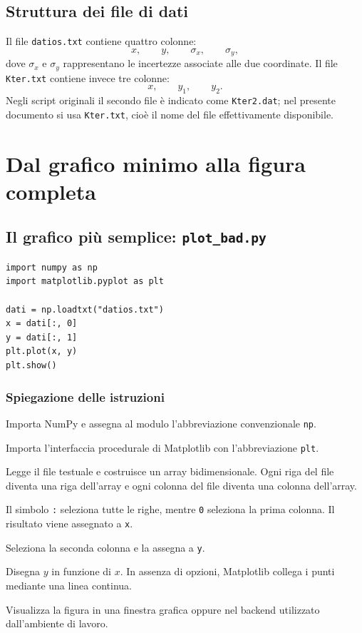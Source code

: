 \documentclass[11pt,a4paper]{book}
\begin{document}
\section{Struttura dei file di dati}
Il file \texttt{datios.txt} contiene quattro colonne:
\[
 x,\qquad y,\qquad \sigma_x,\qquad \sigma_y,
\]
dove $\sigma_x$ e $\sigma_y$ rappresentano le incertezze associate alle due coordinate. Il file \texttt{Kter.txt} contiene invece tre colonne:
\[
 x,\qquad y_1,\qquad y_2.
\]
Negli script originali il secondo file è indicato come \texttt{Kter2.dat}; nel presente documento si usa \texttt{Kter.txt}, cioè il nome del file effettivamente disponibile.

\chapter{Dal grafico minimo alla figura completa}

\section{Il grafico più semplice: \texttt{plot\_bad.py}}
\begin{lstlisting}
import numpy as np
import matplotlib.pyplot as plt

dati = np.loadtxt("datios.txt")
x = dati[:, 0]
y = dati[:, 1]
plt.plot(x, y)
plt.show()
\end{lstlisting}

\subsection*{Spiegazione delle istruzioni}
\begin{description}[style=nextline]
  \item[\texttt{import numpy as np}] Importa NumPy e assegna al modulo l'abbreviazione convenzionale \texttt{np}.
  \item[\texttt{import matplotlib.pyplot as plt}] Importa l'interfaccia procedurale di Matplotlib con l'abbreviazione \texttt{plt}.
  \item[\texttt{np.loadtxt("datios.txt")}] Legge il file testuale e costruisce un array bidimensionale. Ogni riga del file diventa una riga dell'array e ogni colonna del file diventa una colonna dell'array.
  \item[\texttt{dati[:, 0]}] Il simbolo \texttt{:} seleziona tutte le righe, mentre \texttt{0} seleziona la prima colonna. Il risultato viene assegnato a \texttt{x}.
  \item[\texttt{dati[:, 1]}] Seleziona la seconda colonna e la assegna a \texttt{y}.
  \item[\texttt{plt.plot(x, y)}] Disegna $y$ in funzione di $x$. In assenza di opzioni, Matplotlib collega i punti mediante una linea continua.
  \item[\texttt{plt.show()}] Visualizza la figura in una finestra grafica oppure nel backend utilizzato dall'ambiente di lavoro.
\end{description}
\end{document}
